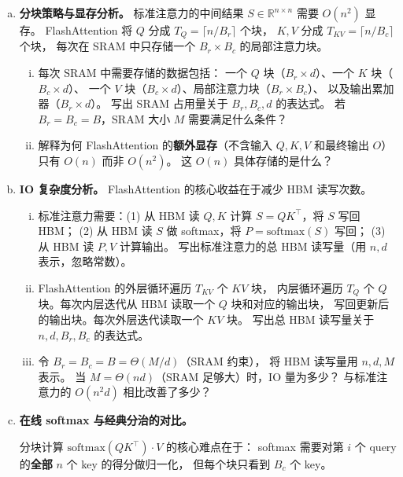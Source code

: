 \documentclass[12pt, a4paper]{ctexart}
\begin{document}
\begin{enumerate}[(a)]
    \item \textbf{分块策略与显存分析。}
    标准注意力的中间结果 $S \in \mathbb{R}^{n \times n}$ 需要 $O(n^2)$ 显存。
    FlashAttention 将 $Q$ 分成 $T_Q = \lceil n/B_r \rceil$ 个块，
    $K, V$ 分成 $T_{KV} = \lceil n/B_c \rceil$ 个块，
    每次在 SRAM 中只存储一个 $B_r \times B_c$ 的局部注意力块。

    \begin{enumerate}[i.]
        \item 每次 SRAM 中需要存储的数据包括：
        一个 $Q$ 块（$B_r \times d$）、一个 $K$ 块（$B_c \times d$）、
        一个 $V$ 块（$B_c \times d$）、局部注意力块（$B_r \times B_c$）、
        以及输出累加器（$B_r \times d$）。
        写出 SRAM 占用量关于 $B_r, B_c, d$ 的表达式。
        若 $B_r = B_c = B$，SRAM 大小 $M$ 需要满足什么条件？
        \item 解释为何 FlashAttention 的\textbf{额外显存}（不含输入 $Q, K, V$ 和最终输出 $O$）
        只有 $O(n)$ 而非 $O(n^2)$。
        这 $O(n)$ 具体存储的是什么？
    \end{enumerate}

    \item \textbf{IO 复杂度分析。}
    FlashAttention 的核心收益在于减少 HBM 读写次数。

    \begin{enumerate}[i.]
        \item 标准注意力需要：(1) 从 HBM 读 $Q, K$ 计算 $S = QK^\top$，将 $S$ 写回 HBM；
        (2) 从 HBM 读 $S$ 做 softmax，将 $P = \text{softmax}(S)$ 写回；
        (3) 从 HBM 读 $P, V$ 计算输出。
        写出标准注意力的总 HBM 读写量（用 $n, d$ 表示，忽略常数）。
        \item FlashAttention 的外层循环遍历 $T_{KV}$ 个 $KV$ 块，
        内层循环遍历 $T_Q$ 个 $Q$ 块。每次内层迭代从 HBM 读取一个 $Q$ 块和对应的输出块，
        写回更新后的输出块。每次外层迭代读取一个 $KV$ 块。
        写出总 HBM 读写量关于 $n, d, B_r, B_c$ 的表达式。
        \item 令 $B_r = B_c = B = \Theta(M/d)$（SRAM 约束），
        将 HBM 读写量用 $n, d, M$ 表示。
        当 $M = \Theta(nd)$（SRAM 足够大）时，IO 量为多少？
        与标准注意力的 $O(n^2 d)$ 相比改善了多少？
    \end{enumerate}

    \item \textbf{在线 softmax 与经典分治的对比。}

    分块计算 $\text{softmax}(QK^\top) \cdot V$ 的核心难点在于：
    softmax 需要对第 $i$ 个 query 的\textbf{全部} $n$ 个 key 的得分做归一化，
    但每个块只看到 $B_c$ 个 key。


\end{enumerate}
\end{document}
